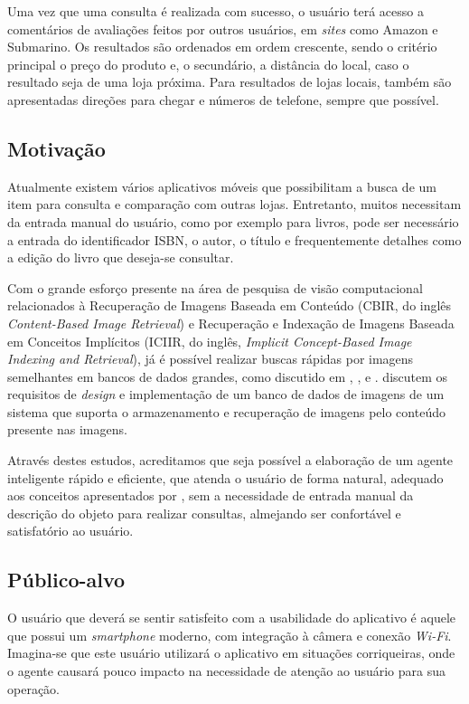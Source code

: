 Uma vez que uma consulta é realizada com sucesso, o usuário terá acesso
a comentários de avaliações feitos por outros usuários, em \textit{sites} como 
Amazon e Submarino.   Os resultados são ordenados em ordem crescente, sendo
o critério principal o preço do produto e, o secundário, a distância do local, caso o 
resultado seja de uma loja próxima.    Para resultados de lojas locais, 
também são apresentadas direções para chegar e números de telefone, sempre
que possível.

\subsection{Motivação}

Atualmente
existem vários aplicativos móveis que possibilitam a busca de um 
item para consulta e comparação com outras lojas.  Entretanto, muitos necessitam
da entrada manual do usuário, como por exemplo para livros, pode ser
necessário a entrada do identificador ISBN, o autor, o título e
frequentemente detalhes como a
edição do livro que deseja-se consultar.

Com o grande esforço presente na área de pesquisa de visão computacional
relacionados à Recuperação de Imagens Baseada em Conteúdo (CBIR,
do inglês \textit{Content-Based Image Retrieval}) e
Recuperação e Indexação de Imagens Baseada em Conceitos Implícitos (ICIIR,
do inglês, \textit{Implicit Concept-Based Image Indexing and Retrieval}), 
já é possível realizar buscas rápidas por imagens semelhantes em bancos de 
dados grandes, como discutido em ,
, 
e .
 discutem os requisitos de \textit{design} e
implementação de um banco de dados de imagens de um sistema que suporta
o armazenamento e recuperação de imagens pelo conteúdo presente nas imagens.

Através destes estudos, acreditamos que seja possível a elaboração de um 
agente inteligente rápido e eficiente, que atenda o usuário de forma 
natural, adequado aos conceitos apresentados por , 
sem a necessidade de entrada
manual da descrição do objeto para realizar consultas, almejando ser confortável
e satisfatório ao usuário.

\subsection{Público-alvo}

O usuário que deverá se sentir satisfeito com a usabilidade do aplicativo
é aquele que possui um \textit{smartphone} moderno, com integração à câmera
e conexão \textit{Wi-Fi}.   Imagina-se que este usuário utilizará o
aplicativo em situações corriqueiras, onde o agente causará pouco impacto
na necessidade de atenção ao usuário para sua operação.

%
  
